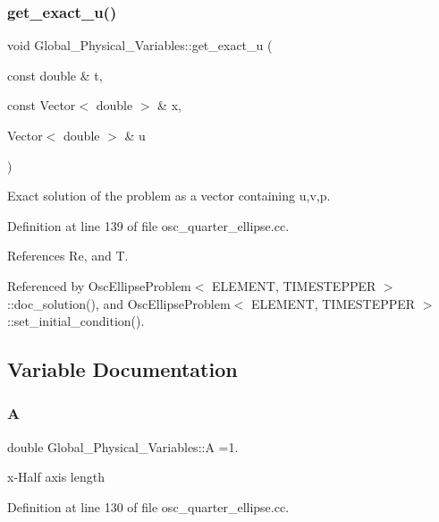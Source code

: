\subsubsection{\texorpdfstring{get\+\_\+exact\+\_\+u()}{get\_exact\_u()}}
{\footnotesize\ttfamily void Global\+\_\+\+Physical\+\_\+\+Variables\+::get\+\_\+exact\+\_\+u (\begin{DoxyParamCaption}\item[{const double \&}]{t,  }\item[{const Vector$<$ double $>$ \&}]{x,  }\item[{Vector$<$ double $>$ \&}]{u }\end{DoxyParamCaption})}



Exact solution of the problem as a vector containing u,v,p. 



Definition at line 139 of file osc\+\_\+quarter\+\_\+ellipse.\+cc.



References Re, and T.



Referenced by Osc\+Ellipse\+Problem$<$ E\+L\+E\+M\+E\+N\+T, T\+I\+M\+E\+S\+T\+E\+P\+P\+E\+R $>$\+::doc\+\_\+solution(), and Osc\+Ellipse\+Problem$<$ E\+L\+E\+M\+E\+N\+T, T\+I\+M\+E\+S\+T\+E\+P\+P\+E\+R $>$\+::set\+\_\+initial\+\_\+condition().



\subsection{Variable Documentation}
\mbox{\label{namespaceGlobal__Physical__Variables_a4894f9a3a9cbf84f00d0719f2841e624}} 
\subsubsection{\texorpdfstring{A}{A}}
{\footnotesize\ttfamily double Global\+\_\+\+Physical\+\_\+\+Variables\+::A =1.}



x-\/\+Half axis length 



Definition at line 130 of file osc\+\_\+quarter\+\_\+ellipse.\+cc.



